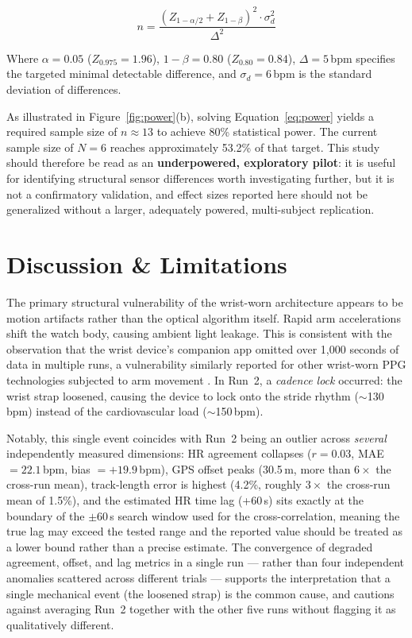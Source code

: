 \documentclass{acmsiggraph}
\begin{document}
\begin{equation}
n = \frac{(Z_{1-\alpha/2}+Z_{1-\beta})^2 \cdot \sigma_d^2}{\Delta^2}
\label{eq:power}
\end{equation}

Where $\alpha=0.05$ ($Z_{0.975}=1.96$), $1-\beta=0.80$ ($Z_{0.80}=0.84$),
$\Delta=5$\,bpm specifies the targeted minimal detectable difference, and
$\sigma_d=6$\,bpm is the standard deviation of differences.

As illustrated in Figure~\ref{fig:power}(b), solving Equation~\ref{eq:power}
yields a required sample size of $n\approx13$ to achieve 80\% statistical
power. The current sample size of $N=6$ reaches approximately 53.2\% of
that target. This study should therefore be read as an
\textbf{underpowered, exploratory pilot}: it is useful for identifying
structural sensor differences worth investigating further, but it is not
a confirmatory validation, and effect sizes reported here should not be
generalized without a larger, adequately powered, multi-subject
replication.

\section{Discussion \& Limitations}

The primary structural vulnerability of the wrist-worn architecture
appears to be motion artifacts rather than the optical algorithm itself.
Rapid arm accelerations shift the watch body, causing ambient light
leakage. This is consistent with the observation that the wrist device's
companion app omitted over 1,000 seconds of data in multiple runs, a
vulnerability similarly reported for other wrist-worn PPG technologies
subjected to arm movement \cite{schweizer2024heart}. In Run~2, a
\emph{cadence lock} occurred: the wrist strap loosened, causing the
device to lock onto the stride rhythm ($\sim$130\,bpm) instead of the
cardiovascular load ($\sim$150\,bpm).

Notably, this single event coincides with Run~2 being an outlier across
\emph{several} independently measured dimensions: HR agreement collapses
($r=0.03$, MAE $=22.1$\,bpm, bias $=+19.9$\,bpm), GPS offset peaks
(30.5\,m, more than $6\times$ the cross-run mean), track-length error is
highest (4.2\%, roughly $3\times$ the cross-run mean of 1.5\%), and the
estimated HR time lag (+60\,s) sits exactly at the boundary of the
$\pm60$\,s search window used for the cross-correlation, meaning the true
lag may exceed the tested range and the reported value should be treated
as a lower bound rather than a precise estimate. The convergence of
degraded agreement, offset, and lag metrics in a single run --- rather
than four independent anomalies scattered across different trials ---
supports the interpretation that a single mechanical event (the loosened
strap) is the common cause, and cautions against averaging Run~2 together
with the other five runs without flagging it as qualitatively different.
\end{document}
